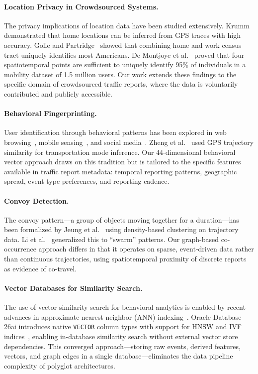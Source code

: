 \documentclass[11pt,a4paper]{article}
\begin{document}
\paragraph{Location Privacy in Crowdsourced Systems.}
The privacy implications of location data have been studied extensively. Krumm~\cite{krumm2007inference} demonstrated that home locations can be inferred from GPS traces with high accuracy. Golle and Partridge~\cite{golle2009anonymity} showed that combining home and work census tract uniquely identifies most Americans. De Montjoye et al.~\cite{demontjoye2013unique} proved that four spatiotemporal points are sufficient to uniquely identify 95\% of individuals in a mobility dataset of 1.5 million users. Our work extends these findings to the specific domain of crowdsourced traffic reports, where the data is voluntarily contributed and publicly accessible.

\paragraph{Behavioral Fingerprinting.}
User identification through behavioral patterns has been explored in web browsing~\cite{olejnik2012browsing}, mobile sensing~\cite{zheng2008understanding}, and social media~\cite{narayanan2009deanonymizing}. Zheng et al.~\cite{zheng2008understanding} used GPS trajectory similarity for transportation mode inference. Our 44-dimensional behavioral vector approach draws on this tradition but is tailored to the specific features available in traffic report metadata: temporal reporting patterns, geographic spread, event type preferences, and reporting cadence.

\paragraph{Convoy Detection.}
The convoy pattern---a group of objects moving together for a duration---has been formalized by Jeung et al.~\cite{jeung2008convoy} using density-based clustering on trajectory data. Li et al.~\cite{li2010swarm} generalized this to ``swarm'' patterns. Our graph-based co-occurrence approach differs in that it operates on sparse, event-driven data rather than continuous trajectories, using spatiotemporal proximity of discrete reports as evidence of co-travel.

\paragraph{Vector Databases for Similarity Search.}
The use of vector similarity search for behavioral analytics is enabled by recent advances in approximate nearest neighbor (ANN) indexing~\cite{johnson2019billion, malkov2018hnsw}. Oracle Database 26ai introduces native \texttt{VECTOR} column types with support for HNSW and IVF indices~\cite{oracle2024vectorsearch}, enabling in-database similarity search without external vector store dependencies. This converged approach---storing raw events, derived features, vectors, and graph edges in a single database---eliminates the data pipeline complexity of polyglot architectures.
\end{document}
